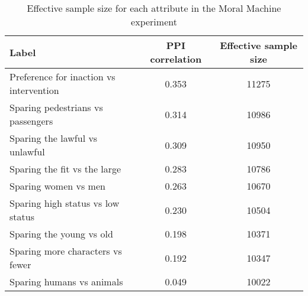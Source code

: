 \begin{table}
\caption{Effective sample size for each attribute in the Moral Machine experiment}
\label{tab:n0MME}
\begin{tabular}{lcc}
\toprule
Label & PPI correlation & Effective sample size \\
\midrule
Preference for inaction vs intervention & 0.353 & 11275 \\
Sparing pedestrians vs passengers & 0.314 & 10986 \\
Sparing the lawful vs unlawful & 0.309 & 10950 \\
Sparing the fit vs the large & 0.283 & 10786 \\
Sparing women vs men & 0.263 & 10670 \\
Sparing high status vs low status & 0.230 & 10504 \\
Sparing the young vs old & 0.198 & 10371 \\
Sparing more characters vs fewer & 0.192 & 10347 \\
Sparing humans vs animals & 0.049 & 10022 \\
\bottomrule
\end{tabular}
\end{table}
